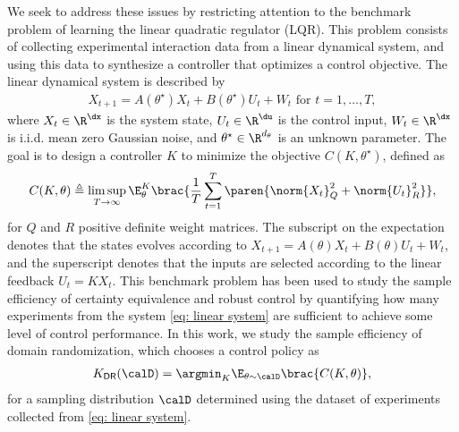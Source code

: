 We seek to address these issues by restricting attention to the benchmark problem of learning the linear quadratic regulator (LQR). This problem consists of collecting experimental interaction data from a linear dynamical system, and using this data to synthesize a controller that optimizes a control objective. The linear dynamical system is described by
\begin{align}
    \label{eq: linear system}
    X_{t+1} = A(\theta^\star) X_t + B(\theta^\star) U_t + W_t \textrm{ for } t=1,\dots, T, 
\end{align}
where $X_t\in\R^{\dx}$ is the system state, $U_t\in\R^{\du}$ is the control input, $W_t\in\R^{\dx}$ is i.i.d. mean zero Gaussian noise, and $\theta^\star\in\R^{d_{\theta}}$ is an unknown parameter. The goal is to design a controller $K$ to minimize the objective $C(K, \theta^\star)$, %
defined as
\begin{align}
    \label{eq: lqr cost}
    C(K, \theta) \triangleq \limsup_{T\to\infty}\E_{\theta}^K 
    \brac{ \frac{1}{T} \sum_{t=1}^T \paren{\norm{X_t}_Q^2 + \norm{U_t}_R^2}},
\end{align}
for $Q$ and $R$ positive definite weight matrices. The subscript on the expectation denotes that the states evolves according to $X_{t+1} = A(\theta) X_t +B(\theta) U_t + W_t$, and the superscript denotes that the inputs are selected according to the linear feedback $U_t = K X_t$. This benchmark problem has been used to study the sample efficiency of certainty equivalence \citep{mania2019certainty} and robust control \citep{dean2020sample} by quantifying how many experiments from the system \eqref{eq: linear system} are sufficient to achieve some level of control performance. In this work, we study the sample efficiency of domain randomization, which chooses a control policy as 
\begin{align}
    \label{eq: domain randomization}
    K_{\mathsf{DR}}(\calD) = \argmin_{K} \E_{\theta\sim \calD} \brac{C(K, \theta)}, 
\end{align}
for a sampling distribution $\calD$ determined using the dataset of experiments collected from \eqref{eq: linear system}. 




